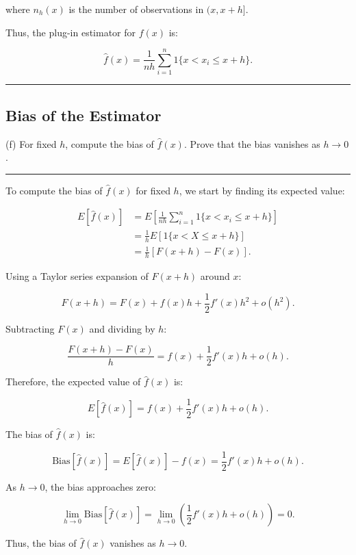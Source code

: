 \documentclass{article}
\newenvironment{colorparagraph}[1]{\par\color{#1}}{\par}
\begin{document}
where \( n_h(x) \) is the number of observations in \( (x, x + h] \).

Thus, the plug-in estimator for \( f(x) \) is:

\[
\hat{f}(x) = \frac{1}{n h} \sum_{i=1}^n 1\{ x < x_i \leq x + h \}.
\]

\begin{colorparagraph}{questioncolor}
\label{q2f}
\rule{\textwidth}{0.5pt}
\subsection{Bias of the Estimator}
(f) For fixed \( h \), compute the bias of \( \hat{f}(x) \). Prove that the bias vanishes as \( h \to 0 \).

\rule{\textwidth}{0.5pt}
\end{colorparagraph}

To compute the bias of \( \hat{f}(x) \) for fixed \( h \), we start by finding its expected value:

\[
\begin{aligned}
E[\hat{f}(x)] &= E\left[ \frac{1}{n h} \sum_{i=1}^n 1\{ x < x_i \leq x + h \} \right] \\
&= \frac{1}{h} E\left[ 1\{ x < X \leq x + h \} \right] \\
&= \frac{1}{h} \left[ F(x + h) - F(x) \right].
\end{aligned}
\]

Using a Taylor series expansion of \( F(x + h) \) around \( x \):

\[
F(x + h) = F(x) + f(x) h + \frac{1}{2} f'(x) h^2 + o(h^2).
\]

Subtracting \( F(x) \) and dividing by \( h \):

\[
\frac{F(x + h) - F(x)}{h} = f(x) + \frac{1}{2} f'(x) h + o(h).
\]

Therefore, the expected value of \( \hat{f}(x) \) is:

\[
E[\hat{f}(x)] = f(x) + \frac{1}{2} f'(x) h + o(h).
\]

The bias of \( \hat{f}(x) \) is:

\[
\text{Bias}[\hat{f}(x)] = E[\hat{f}(x)] - f(x) = \frac{1}{2} f'(x) h + o(h).
\]

As \( h \to 0 \), the bias approaches zero:

\[
\lim_{h \to 0} \text{Bias}[\hat{f}(x)] = \lim_{h \to 0} \left( \frac{1}{2} f'(x) h + o(h) \right) = 0.
\]

Thus, the bias of \( \hat{f}(x) \) vanishes as \( h \to 0 \).
\end{document}
